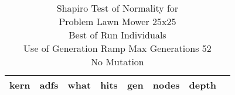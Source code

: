 \begin{table}[H]
\caption{Shapiro Test of Normality for \\ Problem  Lawn Mower 25x25\\Best of Run Individuals \\ Use of Generation Ramp  Max Generations 52\\ No Mutation \\}
\begin{center}
\scalebox{0.8} %
{
\begin{tabular}{lrrrrrrr}
\hline
kern & adfs & what & hits & gen & nodes & depth \\
\hline


\end{tabular}
}
\end{center}
\end{table}

